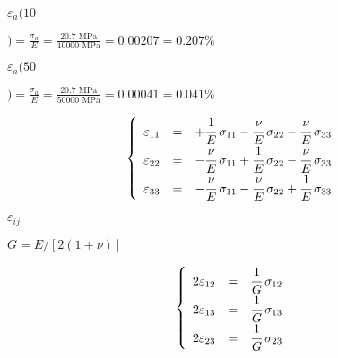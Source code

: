 \documentclass[onecolumn,11pt]{report}
\def\lthtmlcheckvsize{\ifdim\ht\sizebox<\vsize 
  \ifdim\wd\sizebox<\hsize\expandafter\hfill\fi \expandafter\vfill
  \else\expandafter\vss\fi}%
\begin{document}
{\newpage\clearpage
{}%
$\displaystyle \varepsilon_a(10$%
\lthtmlindisplaymathZ
\lthtmlcheckvsize\clearpage}

{\newpage\clearpage
{}%
$\displaystyle ) = \frac{\sigma_a}{E} = \frac{20.7 \text{ MPa}}{10000 \text{ MPa}} = 0.00207 = 0.207 \%
$%
\lthtmlindisplaymathZ
\lthtmlcheckvsize\clearpage}

{\newpage\clearpage
{}%
$\displaystyle \varepsilon_a(50$%
\lthtmlindisplaymathZ
\lthtmlcheckvsize\clearpage}

{\newpage\clearpage
{}%
$\displaystyle ) = \frac{\sigma_a}{E} = \frac{20.7 \text{ MPa}}{50000 \text{ MPa}} = 0.00041 = 0.041 \%
$%
\lthtmlindisplaymathZ
\lthtmlcheckvsize\clearpage}

{\newpage\clearpage
{}%
\begin{displaymath}\left\lbrace
\begin{array}{rcl}
\varepsilon_{11} & = & +\cfrac{1}{E} \: \sigma_{11} -\cfrac{\nu}{E} \: \sigma_{22} -\cfrac{\nu}{E} \: \sigma_{33}\\
\varepsilon_{22} & = &  -\cfrac{\nu}{E} \: \sigma_{11} +\cfrac{1}{E} \: \sigma_{22} - \cfrac{\nu}{E} \: \sigma_{33}\\
\varepsilon_{33} & = & -\cfrac{\nu}{E} \: \sigma_{11} -\cfrac{\nu}{E} \: \sigma_{22} + \cfrac{1}{E} \: \sigma_{33}
\end{array}
\right.\end{displaymath}%
\lthtmldisplayZ
\lthtmlcheckvsize\clearpage}

{\newpage\clearpage
{}%
$ \varepsilon_{ij}$%
\lthtmlindisplaymathZ
\lthtmlcheckvsize\clearpage}

{\newpage\clearpage
{}%
$ G=E/[2(1+\nu)]$%
\lthtmlindisplaymathZ
\lthtmlcheckvsize\clearpage}

{\newpage\clearpage
{}%
\begin{displaymath}\left\lbrace
\begin{array}{rcl}
2 \varepsilon_{12} & = & \cfrac{1}{G} \: \sigma_{12}\\
2 \varepsilon_{13} & = & \cfrac{1}{G} \: \sigma_{13}\\
2 \varepsilon_{23} & = & \cfrac{1}{G} \: \sigma_{23}
\end{array}
\right.\end{displaymath}%
\lthtmldisplayZ
\lthtmlcheckvsize\clearpage}
\end{document}
